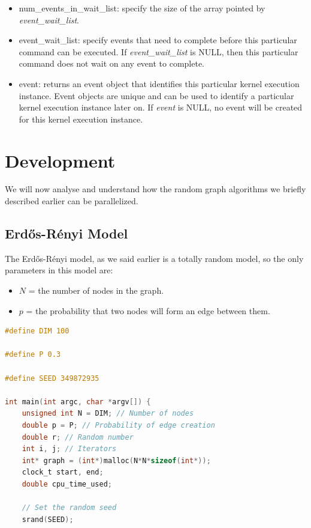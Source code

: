 \documentclass[titlepage]{article}
\begin{document}
\begin{itemize}
\begin{itemize}
        \item num\_events\_in\_wait\_list: specify the size of the array pointed by \textit{event\_wait\_list}.
        \item event\_wait\_list: specify events that need to complete before this particular command can be executed. If \textit{event\_wait\_list} is NULL, then this particular command does not wait on any event to complete.
        \item event: returns an event object that identifies this particular kernel execution instance. Event objects are unique and can be used to identify a particular kernel execution instance later on. If \textit{event} is NULL, no event will be created for this kernel execution instance.
    \end{itemize}
\end{itemize}

\section{Development}
We will now analyse and understand how the random graph algorithms we briefly described earlier can be parallelized.
\subsection{Erdős-Rényi Model}
The Erdős-Rényi model, as we said earlier is a totally random model, so the only parameters in this model are:
\begin{itemize}
    \item $N$ = the number of nodes in the graph.
    \item $p$ = the probability that two nodes will form an edge between them.
\end{itemize}

\begin{minipage}{\linewidth}
\begin{lstlisting}[language=C, style=customc, breaklines=true]
#define DIM 100

#define P 0.3

#define SEED 349872935

int main(int argc, char *argv[]) {
    unsigned int N = DIM; // Number of nodes
    double p = P; // Probability of edge creation
    double r; // Random number
    int i, j; // Iterators
    int* graph = (int*)malloc(N*N*sizeof(int*));
    clock_t start, end;
    double cpu_time_used;

    // Set the random seed
    srand(SEED);
\end{lstlisting}
\end{minipage}
\end{document}
